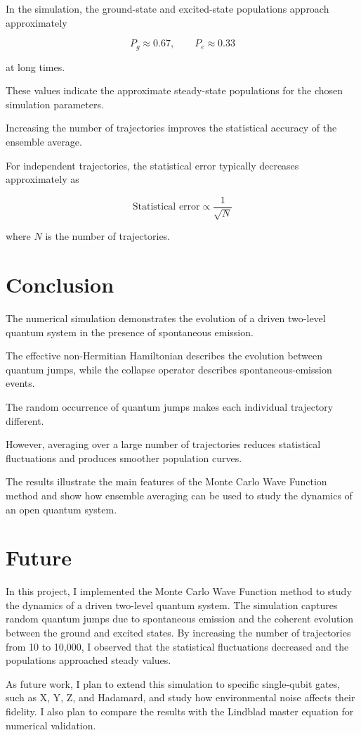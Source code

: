 \documentclass[12pt,a4paper]{report}
\begin{document}
In the simulation, the ground-state and excited-state
populations approach approximately

\begin{equation}
\boxed{
P_g\approx0.67,\qquad P_e\approx0.33
}
\end{equation}

at long times.

These values indicate the approximate steady-state
populations for the chosen simulation parameters.

Increasing the number of trajectories improves the
statistical accuracy of the ensemble average.

For independent trajectories, the statistical error
typically decreases approximately as

\begin{equation}
\boxed{
\text{Statistical error}\propto\frac{1}{\sqrt{N}}
}
\end{equation}

where $N$ is the number of trajectories.

\section{Conclusion}

The numerical simulation demonstrates the evolution
of a driven two-level quantum system in the presence
of spontaneous emission.

The effective non-Hermitian Hamiltonian describes
the evolution between quantum jumps, while the
collapse operator describes spontaneous-emission events.

The random occurrence of quantum jumps makes each
individual trajectory different.

However, averaging over a large number of trajectories
reduces statistical fluctuations and produces smoother
population curves.

The results illustrate the main features of the
Monte Carlo Wave Function method and show how
ensemble averaging can be used to study the
dynamics of an open quantum system.


\section{Future}

In this project, I implemented the Monte Carlo Wave Function method to study the dynamics of a driven two-level quantum system. The simulation captures random quantum jumps due to spontaneous emission and the coherent evolution between the ground and excited states. By increasing the number of trajectories from 10 to 10,000, I observed that the statistical fluctuations decreased and the populations approached steady values.

As future work, I plan to extend this simulation to specific single-qubit gates, such as X, Y, Z, and Hadamard, and study how environmental noise affects their fidelity. I also plan to compare the results with the Lindblad master equation for numerical validation.

\end{document}
